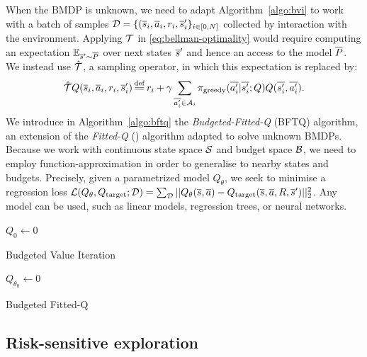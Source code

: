 \documentclass{article}
\begin{document}
When the BMDP is unknown, we need to adapt Algorithm~\ref{algo:bvi} to work with a batch of samples $\mathcal{D}=\{(\overline{s}_i,\overline{a}_i,r_i,\overline{s}_i'\}_{i\in [0,N]}$ collected by interaction with the environment. Applying $\mathcal{T}$ in \eqref{eq:bellman-optimality} would require computing an expectation $\operatorname*{\mathbb{E}}_{\overline{s}'\sim \overline{P}}$ over next states $\overline{s}'$ and hence an access to the model $\overline{P}$. We instead use $\hat{\mathcal{T}}$, a sampling operator, in which this expectation is replaced by:
\begin{equation*}
    \hat{\cT} Q(\os_i, \oa_i, r_i, \os'_i) \eqdef r_i + \gamma \sum_{\ov{a'_i}\in \cA_i} \pi_\text{greedy}(\ov{a'_i}|\ov{s'_i}; Q) Q(\ov{s'_i}, \ov{a'_i}).
\end{equation*}
We introduce in Algorithm~\ref{algo:bftq} the \emph{Budgeted-Fitted-Q} (BFTQ) algorithm, an extension of the \emph{Fitted-Q} (\FTQ) algorithm \citep{Ernst2005,Riedmiller2005} adapted to solve unknown BMDPs. Because we work with  continuous state space $\mathcal{S}$ and budget space $\mathcal{B}$, we need to employ function-approximation in order to generalise to nearby states and budgets. Precisely, given a parametrized model $Q_\theta$, we seek to minimise a regression loss $\mathcal{L}(Q_\theta, Q_\text{target};\mathcal{D}) = \sum_{\mathcal{D}} ||Q_\theta(\overline{s}, \overline{a}) - Q_\text{target}(\overline{s}, \overline{a}, R, \overline{s}')||_2^2$.
Any model can be used, such as linear models, regression trees, or neural networks.

\begin{minipage}[t]{0.47\textwidth}
\vspace{0pt}  
\begin{algorithm}[H]
\label{algo:bvi}
\DontPrintSemicolon
{}
$Q_{0} \leftarrow 0$\;
\caption{Budgeted Value Iteration}
\end{algorithm}
\end{minipage}%
\hfill
\begin{minipage}[t]{0.47\textwidth}
\vspace{0pt}
\begin{algorithm}[H]
\label{algo:bftq}
\DontPrintSemicolon
\KwData{$\cD$}
$Q_{\theta_0} \leftarrow 0$\;
\caption{Budgeted Fitted-Q}
\end{algorithm}
\end{minipage}

\subsection{Risk-sensitive exploration}
\end{document}
